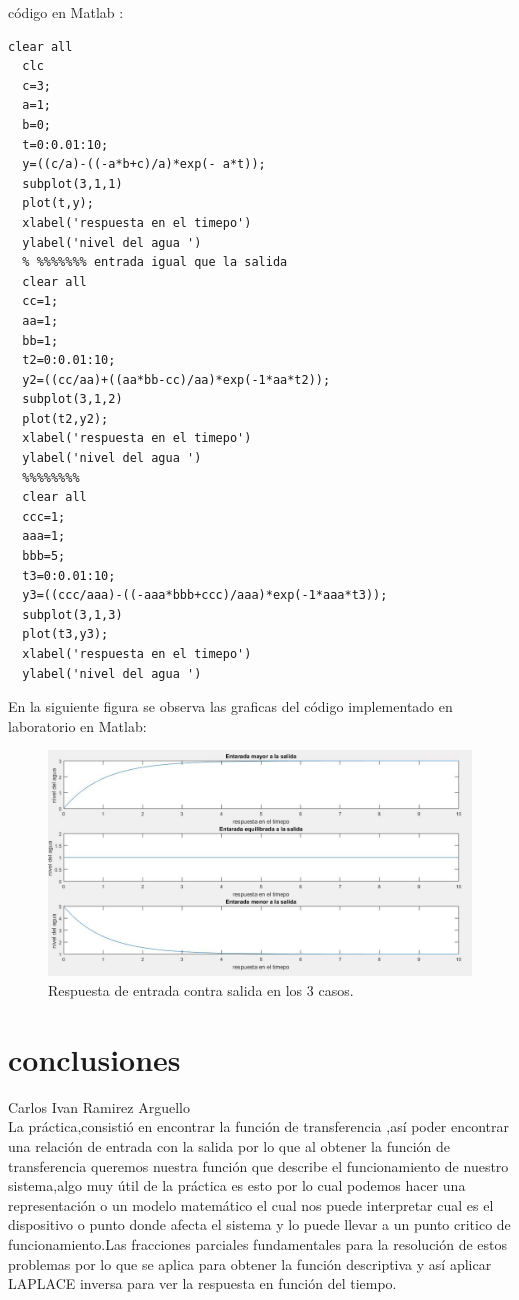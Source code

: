 \documentclass[12pt,a4paper]{report}
\begin{document}
código en Matlab :
\begin{lstlisting}[frame=single]
  clear all
  clc
  c=3;
  a=1;
  b=0;
  t=0:0.01:10;
  y=((c/a)-((-a*b+c)/a)*exp(- a*t));
  subplot(3,1,1)
  plot(t,y);
  xlabel('respuesta en el timepo')
  ylabel('nivel del agua ')
  % %%%%%%% entrada igual que la salida
  clear all
  cc=1;
  aa=1;
  bb=1;
  t2=0:0.01:10;
  y2=((cc/aa)+((aa*bb-cc)/aa)*exp(-1*aa*t2));
  subplot(3,1,2)
  plot(t2,y2);
  xlabel('respuesta en el timepo')
  ylabel('nivel del agua ')
  %%%%%%%%
  clear all
  ccc=1;
  aaa=1;
  bbb=5;
  t3=0:0.01:10;
  y3=((ccc/aaa)-((-aaa*bbb+ccc)/aaa)*exp(-1*aaa*t3));
  subplot(3,1,3)
  plot(t3,y3);
  xlabel('respuesta en el timepo')
  ylabel('nivel del agua ')

\end{lstlisting}
En la siguiente figura se observa las graficas del código implementado en laboratorio en Matlab:
\begin{figure}[h!]
  \centering
    \includegraphics[width=6.0in]{codmio}
  \caption{Respuesta de entrada contra salida en los 3 casos.}
\end{figure}
\newpage
\chapter{conclusiones}
Carlos Ivan Ramirez Arguello\\

La práctica,consistió en encontrar la función de transferencia ,así poder encontrar una relación de entrada con la salida por lo que al obtener la función de transferencia queremos nuestra función que describe el funcionamiento de nuestro sistema,algo muy útil de la práctica es esto por lo cual podemos hacer una representación o un modelo matemático el cual nos puede interpretar cual es el dispositivo o punto donde afecta el sistema y lo puede llevar a un punto  critico de funcionamiento.Las fracciones parciales fundamentales para la resolución de estos problemas por lo que se aplica para obtener la función descriptiva y así aplicar LAPLACE inversa para ver la respuesta en función del tiempo. \\
\end{document}
